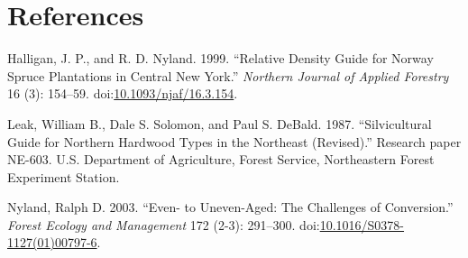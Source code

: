 \documentclass[]{tufte-handout}
\begin{document}
\newpage

\section*{References}\label{references}

\hypertarget{refs}{}
\hypertarget{ref-halligan_relative_1999}{}
Halligan, J. P., and R. D. Nyland. 1999. ``Relative Density Guide for
Norway Spruce Plantations in Central New York.'' \emph{Northern Journal
of Applied Forestry} 16 (3): 154--59.
doi:\href{https://doi.org/10.1093/njaf/16.3.154}{10.1093/njaf/16.3.154}.

\hypertarget{ref-leak_silvicultural_1987}{}
Leak, William B., Dale S. Solomon, and Paul S. DeBald. 1987.
``Silvicultural Guide for Northern Hardwood Types in the Northeast
(Revised).'' Research paper NE-603. U.S. Department of Agriculture,
Forest Service, Northeastern Forest Experiment Station.

\hypertarget{ref-nyland_even-_2003}{}
Nyland, Ralph D. 2003. ``Even- to Uneven-Aged: The Challenges of
Conversion.'' \emph{Forest Ecology and Management} 172 (2-3): 291--300.
doi:\href{https://doi.org/10.1016/S0378-1127(01)00797-6}{10.1016/S0378-1127(01)00797-6}.
\end{document}
